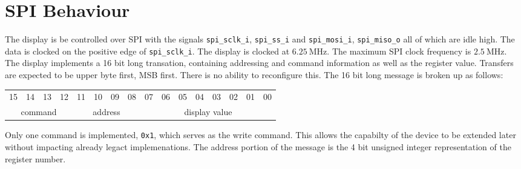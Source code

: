 \documentclass[a4paper,12pt]{article}
\begin{document}
\section*{SPI Behaviour}
The display is be controlled over SPI with the signals \texttt{spi\_sclk\_i}, \texttt{spi\_ss\_i} and \texttt{spi\_mosi\_i}, \texttt{spi\_miso\_o} all of which are idle high. The data is clocked on the positive edge of \texttt{spi\_sclk\_i}. The display is clocked at $6.25~\si{\mega\hertz}$. The maximum SPI clock frequency is $2.5~\si{\mega\hertz}$.\\
The display implements a 16 bit long transation, containing addressing and command information as well as the register value. Transfers are expected to be upper byte first, MSB first. There is no ability to reconfigure this. The 16 bit long message is broken up as follows:
\begin{table}[!h]
	\begin{center} 
		\begin{tabular}{|c|c|c|c| c|c|c|c| c|c|c|c| c|c|c|c|}
			15 & 14 & 13 & 12 & 11 & 10 & 09 & 08 & 07 & 06 & 05 & 04 & 03 & 02 & 01 & 00 \\
			\multicolumn{4}{|c|}{command} & \multicolumn{4}{c|}{address} & \multicolumn{8}{c|}{display value}			
		\end{tabular}
	\end{center}
\end{table}
Only one command is implemented, \texttt{0x1}, which serves as the write command. This allows the capabilty of the device to be extended later without impacting already legact implemenations. The address portion of the message is the 4 bit unsigned integer representation of the register number.
	
\end{document}
